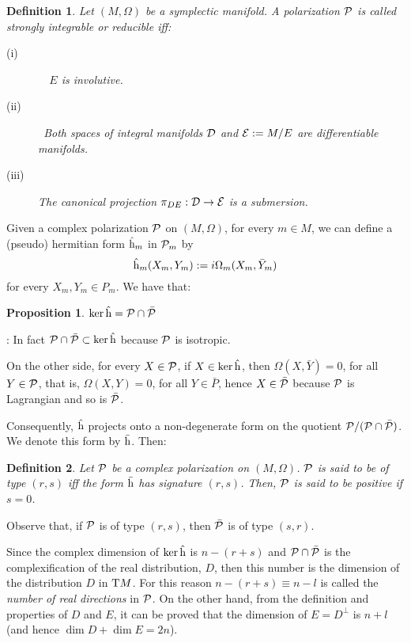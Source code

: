 \documentclass[12pt]{article}
\theoremstyle{plain}
\newtheorem{prop}{Proposition}
\newtheorem{definition}{Definition}
\def\beq{\begin{equation}}
\def\eeq{\end{equation}}
\def\qed{\ifvmode\removelastskip\fi
{\unskip\nobreak\hfil\penalty50\hbox{}\nobreak\hfil
\hbox{\vrule height1.2ex width1.2ex}\parfillskip=0pt
\finalhyphendemerits=0 \par\smallskip}}
\def\P{{\cal P}}
\def\D{{\cal D}}
\def\E{{\cal E}}
\def\h{{\rm h}}
\def\Tan{{\rm T}}
\begin{document}
\begin{definition}
Let $(M,\Omega )$ be a symplectic manifold.
A polarization ${\cal P}$ is called
{\rm strongly integrable} or {\rm reducible} iff:
\begin{description}
\item[{\rm (i)}]\ \
$E$ is involutive.
\item[{\rm (ii)}]\
Both spaces of integral manifolds
$\D$ and $\E := M/E$
are differentiable manifolds.
\item[{\rm (iii)}]
The canonical projection
$\pi_{DE} : \D \to \E$
is a submersion.
\end{description}
\label{sap}
\end{definition}

Given a complex polarization $\P$ on $(M,\Omega )$,
for every $m \in M$, we can define
a (pseudo) hermitian form $\hat \h_m$ in $\P_m$ by
\beq
\hat \h_m(X_m, Y_m) := i\Omega_m(X_m,\bar Y_m)
\label{hermm}
\eeq
for every $X_m,Y_m \in P_m$.
We have that:

\begin{prop}
$\ker \hat \h = \P \cap \bar \P$
\end{prop}
: 
In fact $\P \cap \bar\P \subset \ker \hat \h$ because $\P$ is isotropic.

On the other side, for every $X \in \P$, if $X \in \ker \hat \h$, then
$\Omega (X,\bar Y)=0$, for all $Y \in \P$,
that is, $\Omega (X,Y)=0$, for all $Y \in \bar P$,
hence $X \in \bar \P$ because $\P$ is Lagrangian
and so is $\bar \P$.
\qed

Consequently, $\hat \h$ projects onto a non-degenerate form
on the quotient $\P /(\P \cap \bar \P )$.
We denote this form by $\bar \h$. Then:

\begin{definition}
Let $\P$ be a complex polarization on $(M,\Omega )$.
$\P$ is said to be
{\rm of type $(r,s)$} iff
the form $\bar \h$ has signature $(r,s)$.
Then, $\P$ is said to be
{\rm positive} if $s=0$.
\label{typrs}
\end{definition}
Observe that, if $\P$ is of type $(r,s)$,
then $\bar \P$ is of type $(s,r)$.

Since the complex dimension of $\ker \hat \h$ is $n-(r+s)$
and $\P \cap \bar \P$ is the complexification of the real distribution,
$D$, then this number is the dimension of the distribution $D$ in $\Tan
M$.
For this reason $n-(r+s) \equiv n-l$ is called the
{\it number of real directions} in $\P$.
On the other hand, from the definition and properties
of $D$ and $E$, it can be proved that the dimension of $E=D^{\perp}$
is $n+l$ (and hence  $\dim D + \dim E = 2n$).
\end{document}
